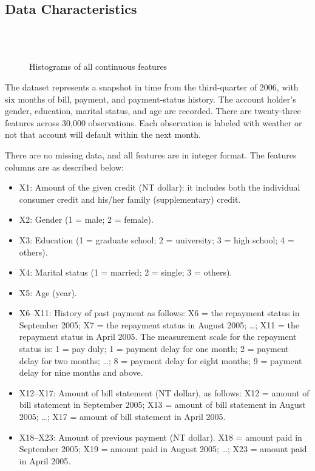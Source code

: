 \documentclass[conference]{IEEEtran}
\begin{document}
\subsection{Data Characteristics}

\begin{figure}[ht]
	\\
	\\
	\caption{Histograms of all continuous features}
	\label{hists}
\end{figure}

The dataset represents a snapshot in time from the third-quarter of 2006, with
six months of bill, payment, and payment-status history. The account holder's
gender, education, marital status, and age are recorded. There are twenty-three
features across 30,000 observations. Each observation is labeled with weather
or not that account will default within the next month.

There are no missing data, and all features are in integer format. The features
columns are as described below\cite{Yeh2009TheCO}:

\begin{itemize}
	\item X1: Amount of the given credit (NT dollar): it includes both the individual
	      consumer credit and his/her family (supplementary) credit.
	\item X2: Gender (1 = male; 2 = female).
	\item X3: Education (1 = graduate school; 2 = university; 3 = high school; 4 =
	      others).
	\item X4: Marital status (1 = married; 2 = single; 3 = others).
	\item X5: Age (year).
	\item X6–X11: History of past payment as follows: X6 = the repayment status in
	      September 2005; X7 = the repayment status in August 2005; \ldots ; X11 = the
	      repayment status in April 2005. The measurement scale for the repayment status
	      is: 1 = pay duly; 1 = payment delay for one month; 2 = payment delay for two
	      months; \ldots ; 8 = payment delay for eight months; 9 = payment delay for nine
	      months and above.
	\item X12–X17: Amount of bill statement (NT dollar), as follows: X12 = amount of bill
	      statement in September 2005; X13 = amount of bill statement in August 2005;
	      \ldots ; X17 = amount of bill statement in April 2005.
	\item X18–X23: Amount of previous payment (NT dollar). X18 = amount paid in September
	      2005; X19 = amount paid in August 2005; \ldots ; X23 = amount paid in April
	      2005.
\end{itemize}
\end{document}
